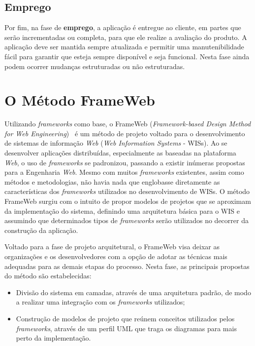 \subsection{Emprego}
\label{sec-ref-emprego}

Por fim, na fase de \textbf{emprego}, a aplicação é entregue ao cliente, em partes que serão incrementadas ou completa, para que ele realize a avaliação do produto. A aplicação deve ser mantida sempre atualizada e permitir uma manutenibilidade fácil para garantir que esteja sempre disponível e seja funcional. Nesta fase ainda podem ocorrer mudanças estruturadas ou não estruturadas.

\section{O Método FrameWeb}
\label{sec-ref-frameweb}

Utilizando \textit{frameworks} como base, o FrameWeb (\textit{Framework-based Design Method for Web Engineering})~\cite{souza:masterthesis07,souza-celebratingfalbo20} é um método de projeto voltado para o desenvolvimento de sistemas de informação \textit{Web} (\textit{Web Information Systems} - WISs). Ao se desenvolver aplicações distribuídas, especialmente as baseadas na plataforma \textit{Web}, o uso de \textit{frameworks} se padronizou, passando a existir inúmeras propostas para a Engenharia \textit{Web}. Mesmo com muitos \textit{frameworks} existentes, assim como métodos e metodologias, não havia nada que englobasse diretamente as características dos \textit{frameworks} utilizados no desenvolvimento de WISs. O método FrameWeb surgiu com o intuito de propor modelos de projetos que se aproximam da implementação do sistema, definindo uma arquitetura básica para o WIS e assumindo que determinados tipos de \textit{frameworks} serão utilizados no decorrer da construção da aplicação.

Voltado para a fase de projeto arquitetural, o FrameWeb visa deixar as organizações e os desenvolvedores com a opção de adotar as técnicas mais adequadas para as demais etapas do processo. Nesta fase, as principais propostas do método são estabelecidas:
  
\begin{itemize}
	
	\item Divisão do sistema em camadas, através de uma arquitetura padrão, de modo a realizar uma integração com os \textit{frameworks} utilizados;
	
	\item Construção de modelos de projeto que reúnem conceitos utilizados pelos \textit{frameworks}, através de um perfil UML que traga os diagramas para mais perto da implementação.

\end{itemize}

